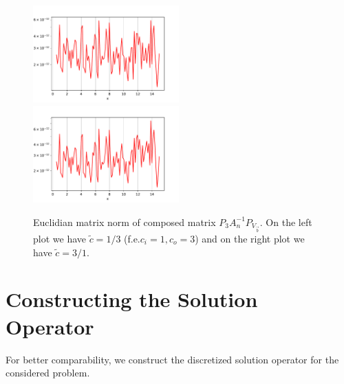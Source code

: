 \documentclass[10pt,journal,compsoc, onecolumn]{IEEEtran}
\begin{document}
\begin{figure}
    \includegraphics[width=0.5\textwidth]{validate_p_c_i1,0c_o3,0N_100plotRangeStart_0,5plotRangeEnd_15,0.pdf}
    \includegraphics[width=0.5\textwidth]{validate_p_c_i3,0c_o1,0N_100plotRangeStart_0,5plotRangeEnd_15,0.pdf}
    \caption{Euclidian matrix norm of composed matrix  $P_3A_n^{-1}P_{V_{\vec{b}}}$. 
     On the left plot we have $\tilde c = 1/3$ (f.e.$c_i = 1, c_o = 3$)
    and on the right plot we have $\tilde c = 3/1$.
    }
   \label{fig:p_validation}
\end{figure}

\section{Constructing the Solution Operator}
For better comparability, we construct the discretized solution operator for the considered problem.
\end{document}
